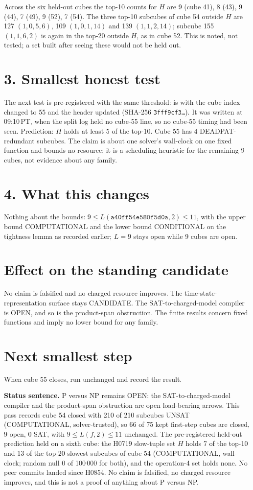 \documentclass[11pt]{article}
\begin{document}
Across the six held-out cubes the top-10 counts for $H$ are 9 (cube 41), 8 (43), 9 (44), 7 (49), 9 (52), 7 (54). The three top-10 subcubes of cube 54 outside $H$ are 127 $(1,0,5,6)$, 109 $(1,0,1,14)$ and 139 $(1,1,2,14)$; subcube 155 $(1,1,6,2)$ is again in the top-20 outside $H$, as in cube 52. This is noted, not tested; a set built after seeing these would not be held out.

\section*{3. Smallest honest test}
The next test is pre-registered with the same threshold:  is  with the cube index changed to 55 and the header updated (SHA-256 \texttt{3fff9cf3\ldots}). It was written at 09:10\,PT, when the split log held no cube-55 line, so no cube-55 timing had been seen. Prediction: $H$ holds at least 5 of the top-10. Cube 55 has 4 DEADPAT-redundant subcubes. The claim is about one solver's wall-clock on one fixed function and bounds no resource; it is a scheduling heuristic for the remaining 9 cubes, not evidence about any family.

\section*{4. What this changes}
Nothing about the bounds: $9\le L(\texttt{a40ff54e580f5d0a},2)\le 11$, with the upper bound COMPUTATIONAL and the lower bound CONDITIONAL on the tightness lemma as recorded earlier; $L=9$ stays open while 9 cubes are open.

\section*{Effect on the standing candidate}
No claim is falsified and no charged resource improves. The time-state-representation surface stays CANDIDATE. The SAT-to-charged-model compiler is OPEN, and so is the product-span obstruction. The finite results concern fixed functions and imply no lower bound for any family.

\section*{Next smallest step}
When cube 55 closes, run  unchanged and record the result.

\bigskip
\noindent\textbf{Status sentence.} P versus NP remains OPEN: the SAT-to-charged-model compiler and the product-span obstruction are open load-bearing arrows. This pass records cube 54 closed with 210 of 210 subcubes UNSAT (COMPUTATIONAL, solver-trusted), so 66 of 75 kept first-step cubes are closed, 9 open, 0 SAT, with $9\le L(f,2)\le 11$ unchanged. The pre-registered held-out prediction held on a sixth cube: the H0719 slow-tuple set $H$ holds 7 of the top-10 and 13 of the top-20 slowest subcubes of cube 54 (COMPUTATIONAL, wall-clock; random null 0 of 100\,000 for both), and the operation-4 set holds none. No peer commits landed since H0854. No claim is falsified, no charged resource improves, and this is not a proof of anything about P versus NP.
\end{document}
